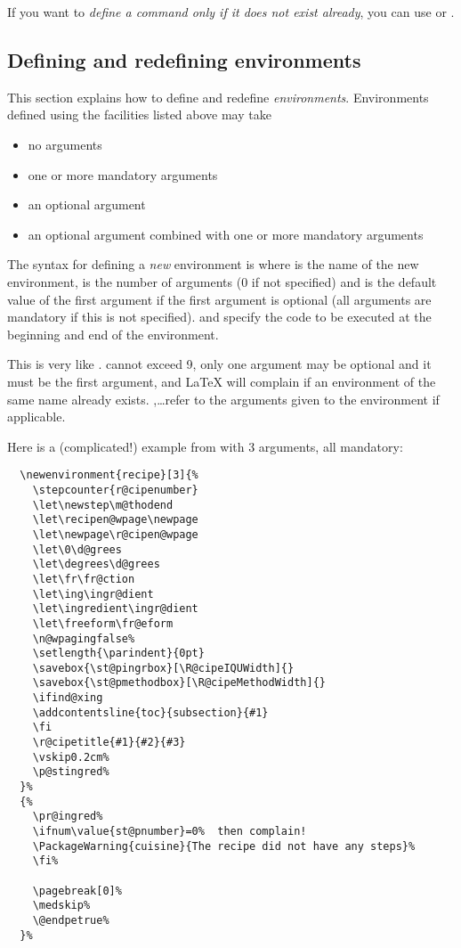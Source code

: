 If you want to \emph{define a command only if it does not exist already}, you can use  or .

\subsection{Defining and redefining environments}\label{subsec:env}

This section explains how to define and redefine \emph{environments}.
Environments defined using the \LaTeXe{} facilities listed above may take
\begin{itemize}
  \item no arguments
  \item one or more mandatory arguments
  \item an optional argument
  \item an optional argument combined with one or more mandatory arguments
\end{itemize}
The syntax for defining a \emph{new} environment is
where  is the name of the new environment,  is the number of arguments (0 if not specified) and  is the default value of the first argument if the first argument is optional (all arguments are mandatory if this is not specified).
 and  specify the code to be executed at the beginning and end of the environment.

This is very like .
 cannot exceed 9, only one argument may be optional and it must be the first argument, and \LaTeX{} will complain if an environment of the same name already exists. \narg,\dots \narg[9] refer to the arguments given to the environment if applicable.

Here is a (complicated!) example from  with 3 arguments, all mandatory:

\begin{verbatim}
  \newenvironment{recipe}[3]{%
    \stepcounter{r@cipenumber}
    \let\newstep\m@thodend
    \let\recipen@wpage\newpage
    \let\newpage\r@cipen@wpage
    \let\0\d@grees
    \let\degrees\d@grees
    \let\fr\fr@ction
    \let\ing\ingr@dient
    \let\ingredient\ingr@dient
    \let\freeform\fr@eform
    \n@wpagingfalse%
    \setlength{\parindent}{0pt}
    \savebox{\st@pingrbox}[\R@cipeIQUWidth]{}
    \savebox{\st@pmethodbox}[\R@cipeMethodWidth]{}
    \ifind@xing
    \addcontentsline{toc}{subsection}{#1}
    \fi
    \r@cipetitle{#1}{#2}{#3}
    \vskip0.2cm%
    \p@stingred%
  }%
  {%
    \pr@ingred%
    \ifnum\value{st@pnumber}=0%  then complain!
    \PackageWarning{cuisine}{The recipe did not have any steps}%
    \fi%

    \pagebreak[0]%
    \medskip%
    \@endpetrue%
  }%
\end{verbatim}


